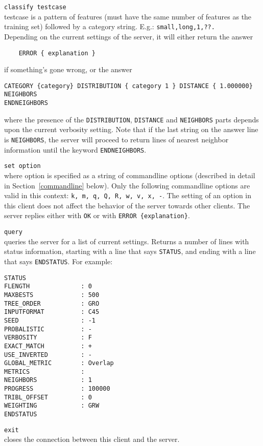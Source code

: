 \documentclass{report}
\begin{document}
\begin{description}
\item {\tt classify testcase}\\
      testcase is a pattern of features (must have the same number of
      features as the training set) followed by a category
      string. E.g.: {\tt small,long,1,??.}\\
      Depending on the current settings of the server, it will either
      return the answer 
      \begin{verbatim}
	ERROR { explanation }
      \end{verbatim}
      if something's gone wrong, or the answer
      \begin{verbatim}
CATEGORY {category} DISTRIBUTION { category 1 } DISTANCE { 1.000000} NEIGHBORS
ENDNEIGHBORS
      \end{verbatim}
      where the presence of the {\tt DISTRIBUTION}, {\tt DISTANCE} and {\tt NEIGHBORS}
parts depends upon the current verbosity setting. Note that if the
last string on the answer line is {\tt NEIGHBORS}, the server will
proceed to return lines of nearest neighbor information until the
keyword {\tt ENDNEIGHBORS}.
\item {\tt set option}\\
      where option is specified as a string of commandline options
(described in detail in Section~\ref{commandline} below). Only the
following commandline options are valid in this context: {\tt k, m, q, Q,
R, w, v, x, -}. The
setting of an option in this client 
does not affect the behavior of the server
towards other clients. The server replies either with {\tt OK} or with
{\tt ERROR \{explanation\}}. 
\item {\tt query}\\
      queries the server for a list of current settings. Returns a
number of lines with status information, starting with a line that
says {\tt STATUS}, and ending with a line that says {\tt ENDSTATUS}. For example:

\begin{verbatim}
STATUS
FLENGTH              : 0
MAXBESTS             : 500
TREE_ORDER           : GRO
INPUTFORMAT          : C45
SEED                 : -1
PROBALISTIC          : -
VERBOSITY            : F
EXACT_MATCH          : +
USE_INVERTED         : -
GLOBAL_METRIC        : Overlap
METRICS              : 
NEIGHBORS            : 1
PROGRESS             : 100000
TRIBL_OFFSET         : 0
WEIGHTING            : GRW
ENDSTATUS
\end{verbatim}

\item {\tt exit}\\
      closes the connection between this client and the server.
\end{description}
\end{document}
